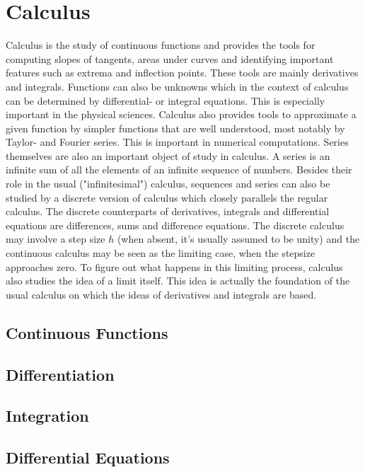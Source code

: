 \documentclass[12pt]{article}
\begin{document}
\section{Calculus}
Calculus is the study of continuous functions and provides the tools for computing slopes of tangents, areas under curves and identifying important features such as extrema and inflection points. These tools are mainly derivatives and integrals. Functions can also be unknowns which in the context of calculus can be determined by differential- or integral equations. This is especially important in the physical sciences. Calculus also provides tools to approximate a given function by simpler functions that are well understood, most notably by Taylor- and Fourier series. This is important in numerical computations. Series themselves are also an important object of study in calculus. A series is an infinite sum of all the elements of an infinite sequence of numbers. Besides their role in the usual ("infinitesimal") calculus, sequences and series can also be studied by a discrete version of calculus which closely parallels the regular calculus. The discrete counterparts of derivatives, integrals and differential equations are differences, sums and difference equations. The discrete calculus may involve a step size $h$ (when absent, it's usually assumed to be unity) and the continuous calculus may be seen as the limiting case, when the stepsize approaches zero. To figure out what happens in this limiting process, calculus also studies the idea of a limit itself. This idea is actually the foundation of the usual calculus on which the ideas of derivatives and integrals are based.
\subsection{Continuous Functions}
  
\subsection{Differentiation}
 
\subsection{Integration} 
  
\subsection{Differential Equations}
\end{document}
